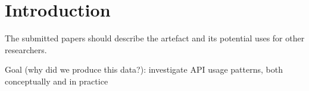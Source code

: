 \section{Introduction}
\label{sec:introduction}



The submitted papers should describe the artefact and its potential uses for other researchers.


Goal (why did we produce this data?):
investigate API usage patterns, both conceptually and in practice



